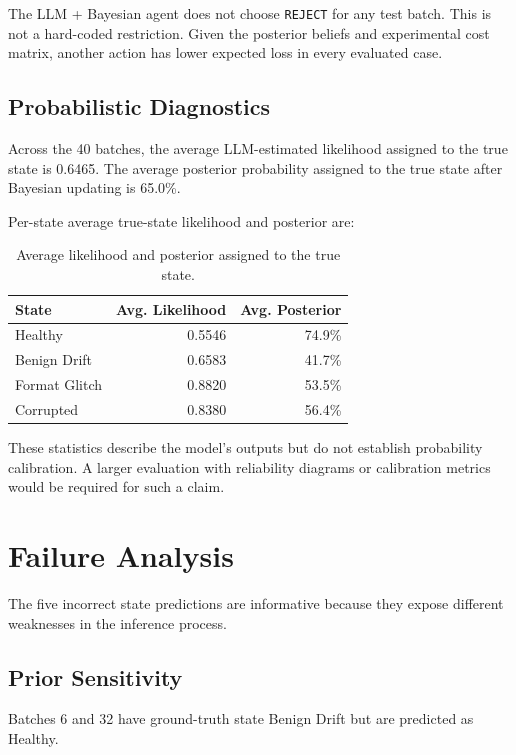 \documentclass{article}
\begin{document}
The LLM + Bayesian agent does not choose \texttt{REJECT} for any test batch. This is not a hard-coded restriction. Given the posterior beliefs and experimental cost matrix, another action has lower expected loss in every evaluated case.


\subsection{Probabilistic Diagnostics}

Across the 40 batches, the average LLM-estimated likelihood assigned to the true state is 0.6465. The average posterior probability assigned to the true state after Bayesian updating is 65.0\%.

Per-state average true-state likelihood and posterior are:

\begin{table}[t]
\centering
\small
\begin{tabular}{lrr}
\toprule
State & Avg. Likelihood & Avg. Posterior \\
\midrule
Healthy       & 0.5546 & 74.9\% \\
Benign Drift  & 0.6583 & 41.7\% \\
Format Glitch & 0.8820 & 53.5\% \\
Corrupted     & 0.8380 & 56.4\% \\
\bottomrule
\end{tabular}
\caption{Average likelihood and posterior assigned to the true state.}
\label{tab:probdiag}
\end{table}

These statistics describe the model's outputs but do not establish probability calibration. A larger evaluation with reliability diagrams or calibration metrics would be required for such a claim.


\section{Failure Analysis}

The five incorrect state predictions are informative because they expose different weaknesses in the inference process.

\subsection{Prior Sensitivity}

Batches 6 and 32 have ground-truth state Benign Drift but are predicted as Healthy.
\end{document}
